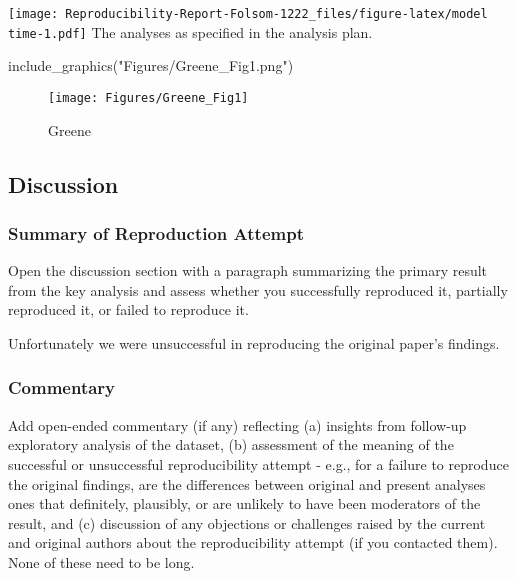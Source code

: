 \documentclass[
]{article}
\newenvironment{Shaded}{\begin{snugshade}}{\end{snugshade}}
\newcommand{\FunctionTok}[1]{\textcolor[rgb]{0.00,0.00,0.00}{#1}}
\newcommand{\NormalTok}[1]{#1}
\newcommand{\StringTok}[1]{\textcolor[rgb]{0.31,0.60,0.02}{#1}}
\begin{document}
\texttt{[image: Reproducibility-Report-Folsom-1222\_files/figure-latex/model time-1.pdf]}
The analyses as specified in the analysis plan.

\begin{Shaded}
\begin{Highlighting}[]
\FunctionTok{include\_graphics}\NormalTok{(}\StringTok{"Figures/Greene\_Fig1.png"}\NormalTok{)}
\end{Highlighting}
\end{Shaded}

\begin{figure}
\texttt{[image: Figures/Greene\_Fig1]} \caption{Greene}\label{fig:unnamed-chunk-2}
\end{figure}

\hypertarget{discussion}{%
\subsection{Discussion}\label{discussion}}

\hypertarget{summary-of-reproduction-attempt}{%
\subsubsection{Summary of Reproduction
Attempt}\label{summary-of-reproduction-attempt}}

Open the discussion section with a paragraph summarizing the primary
result from the key analysis and assess whether you successfully
reproduced it, partially reproduced it, or failed to reproduce it.

Unfortunately we were unsuccessful in reproducing the original paper's
findings.

\hypertarget{commentary}{%
\subsubsection{Commentary}\label{commentary}}

Add open-ended commentary (if any) reflecting (a) insights from
follow-up exploratory analysis of the dataset, (b) assessment of the
meaning of the successful or unsuccessful reproducibility attempt -
e.g., for a failure to reproduce the original findings, are the
differences between original and present analyses ones that definitely,
plausibly, or are unlikely to have been moderators of the result, and
(c) discussion of any objections or challenges raised by the current and
original authors about the reproducibility attempt (if you contacted
them). None of these need to be long.
\end{document}

